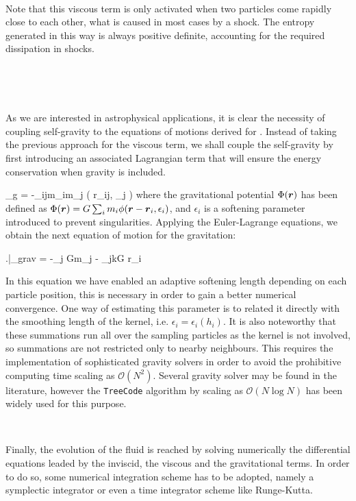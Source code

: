 \documentclass[a4,useAMS,usenatbib,usegraphicx,12pt]{article}
\begin{document}
\

Note that this viscous term is only activated when two particles come rapidly 
close to each other, what is caused in most cases by a shock. The entropy 
generated in this way is always positive definite, accounting for the required
dissipation in shocks.

\

\

As we are interested in astrophysical applications, it is clear the necessity 
of coupling self-gravity to the equations of motions derived for \SPH. Instead 
of taking the previous approach for the viscous term, we shall couple the
self-gravity by first introducing an associated Lagrangian term that will
ensure the energy conservation when gravity is included.

{ _g = -\sum_{i\neq j}m_im_j \phi( r_{ij}, \epsilon_j ) }
where the gravitational potential $\Phi(\boldsymbol{ r })$ has been defined as 
$\Phi(\boldsymbol{ r }) = G \sum_i m_i \phi(\boldsymbol{ r } - \boldsymbol{ r }_i, \epsilon_i)$, and $\epsilon_i$
is a softening parameter introduced to prevent singularities. Applying the 
Euler-Lagrange equations, we obtain the next equation of motion for the 
gravitation:


{ \left.\right|_{\mbox{\footnotesize{grav}}} = 
-\sum_j Gm_j  - \sum_{j\neq k}G
{\partial \bds r_i} }


In this equation we have enabled an adaptive softening length depending on each 
particle position, this is necessary in order to gain a better numerical 
convergence. One way of estimating this parameter is to related it directly with
the smoothing length of the kernel, i.e. $\epsilon_i = \epsilon_i(h_i)$. It is 
also noteworthy that these summations run all over the sampling particles as the 
kernel is not involved, so summations are not restricted only to nearby neighbours. 
This requires the implementation of sophisticated gravity solvers in order to 
avoid the prohibitive computing time scaling as $\mathcal{O}(N^2)$. Several 
gravity solver may be found in the literature, however the \texttt{TreeCode} 
algorithm by \citet{barnes1986} scaling as $\mathcal{O}(N\log N)$ has been widely 
used for this purpose.

\

Finally, the evolution of the fluid is reached by solving numerically the 
differential equations leaded by the inviscid, the viscous and the gravitational 
terms. In order to do so, some numerical integration scheme has to be adopted,
namely a symplectic integrator or even a time integrator scheme like Runge-Kutta.
\end{document}

